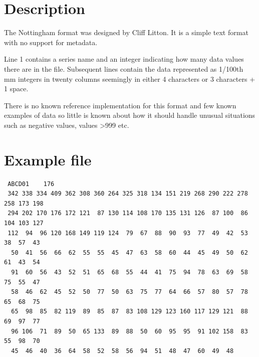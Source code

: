 \section{Description}

The Nottingham format was designed by Cliff Litton. It is a simple text format with no support for metadata.

Line 1 contains a series name and an integer indicating how many data values there are in the file. Subsequent lines contain the data represented as 1/100th mm integers in twenty columns seemingly in either 4 characters or 3 characters + 1 space.

There is no known reference implementation for this format and few known examples of data so little is known about how it should handle unusual situations such as negative values, values >999 etc. 

\newpage
\section{Example file}

\begin{lstlisting}
 ABCD01    176
 342 338 334 409 362 308 360 264 325 318 134 151 219 268 290 222 278 258 173 198
 294 202 170 176 172 121  87 130 114 108 170 135 131 126  87 100  86 104 103 127
 112  94  96 120 168 149 119 124  79  67  88  90  93  77  49  42  53  38  57  43
  50  41  56  66  62  55  55  45  47  63  58  60  44  45  49  50  62  61  43  54
  91  60  56  43  52  51  65  68  55  44  41  75  94  78  63  69  58  75  55  47
  58  46  62  45  52  50  77  50  63  75  77  64  66  57  80  57  78  65  68  75
  65  98  85  82 119  89  85  87  83 108 129 123 160 117 129 121  88  69  97  77
  96 106  71  89  50  65 133  89  88  50  60  95  95  91 102 158  83  55  98  70
  45  46  40  36  64  58  52  58  56  94  51  48  47  60  49  48
\end{lstlisting}

